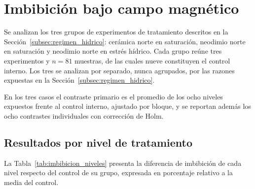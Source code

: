 \section{Imbibición bajo campo magnético}
\label{sec:res_imbibicion}

Se analizan los tres grupos de experimentos de tratamiento descritos en la Sección~\ref{subsec:regimen_hidrico}: cerámica norte en saturación, neodimio norte en saturación y neodimio norte en estrés hídrico. Cada grupo reúne tres experimentos y \(n = 81\) muestras, de las cuales nueve constituyen el control interno. Los tres se analizan por separado, nunca agrupados, por las razones expuestas en la Sección~\ref{subsec:regimen_hidrico}.

En los tres casos el contraste primario es el promedio de los ocho niveles expuestos frente al control interno, ajustado por bloque, y se reportan además los ocho contrastes individuales con corrección de Holm.

\subsection{Resultados por nivel de tratamiento}

La Tabla~\ref{tab:imbibicion_niveles} presenta la diferencia de imbibición de cada nivel respecto del control de su grupo, expresada en porcentaje relativo a la media del control.

